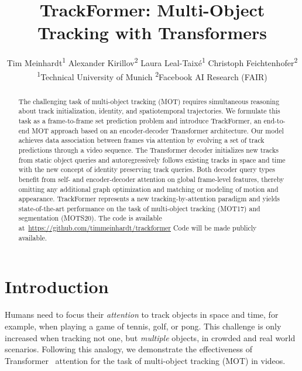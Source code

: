\documentclass[10pt,twocolumn,letterpaper]{article}
\def\titlename{TrackFormer: Multi-Object Tracking with Transformers}
\begin{document}
\title{\titlename}

\author{
	Tim Meinhardt\textsuperscript{1}\footnotemark \qquad
	Alexander Kirillov\textsuperscript{2} \qquad
	Laura Leal-Taixé\textsuperscript{1} \qquad
	Christoph Feichtenhofer\textsuperscript{2} \vspace{.8em}\\
	\textsuperscript{1}Technical University of Munich \qquad \qquad
	\textsuperscript{2}Facebook AI Research (FAIR)
}

\maketitle

\ificcvfinal
	\renewcommand*{\thefootnote}{\fnsymbol{footnote}}
	\setcounter{footnote}{1}
	\renewcommand*{\thefootnote}{\arabic{footnote}}
	\setcounter{footnote}{0}
\fi \begin{abstract}
    The challenging task of multi-object tracking (MOT) requires simultaneous reasoning about track initialization, identity, and spatiotemporal trajectories.
We formulate this task as a frame-to-frame set prediction problem and introduce TrackFormer, an end-to-end MOT approach based on an encoder-decoder Transformer architecture.
Our model achieves data association between frames via attention by evolving a set of track predictions through a video sequence.
The Transformer decoder initializes new tracks from static object queries and autoregressively follows existing tracks in space and time with the new concept of identity preserving track queries.
Both decoder query types benefit from self- and encoder-decoder attention on global frame-level features, thereby omitting any additional graph optimization and matching or modeling of motion and appearance.
TrackFormer represents a new tracking-by-attention paradigm and yields state-of-the-art performance on the task of multi-object tracking (MOT17) and segmentation (MOTS20).
\ificcvfinal
        The code is available at~\url{https://github.com/timmeinhardt/trackformer}
    \else
        Code will be made publicly available.
    \fi

\end{abstract} \section{Introduction}

Humans need to focus their \textit{attention} to track objects in space and time, for example, when playing a game of tennis, golf, or pong.
This challenge is only increased when tracking not one, but \textit{multiple} objects, in crowded and real world scenarios.
Following this analogy, we demonstrate the effectiveness of Transformer~\cite{attention_is_all_you_need} attention for the task of multi-object tracking (MOT) in videos.
\end{document}
